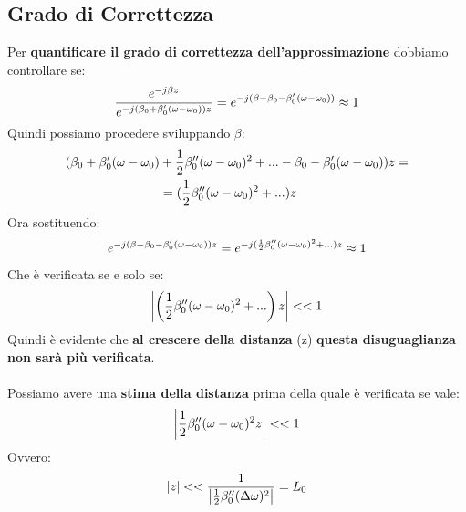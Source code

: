 \subsection{Grado di Correttezza}
Per \textbf{quantificare il grado di correttezza dell'approssimazione} dobbiamo controllare se:
\begin{equation*}
    \frac{e^{-j\beta z}}{e^{-j(\beta_0 + \beta'_0 (\omega - \omega_0))z}} = e^{-j (\beta - \beta_0 - \beta'_0 (\omega - \omega_0))} \approx 1
\end{equation*}
Quindi possiamo procedere sviluppando $\beta$:
\begin{equation*}
\begin{aligned}
        (\beta_0 + \beta'_0 (\omega - \omega_0) &+ \frac{1}{2}\beta''_0 (\omega - \omega_0)^2 + ... - \beta_0 - \beta'_0 (\omega - \omega_0) )z = \\
        &=(\frac{1}{2} \beta''_0 (\omega - \omega_0)^2 + ...)z
\end{aligned}
\end{equation*}
Ora sostituendo:
\begin{equation*}
    e^{-j(\beta - \beta_0 - \beta'_0 (\omega - \omega_0))z} = e^{-j(\frac{1}{2} \beta''_0(\omega - \omega_0)^2 + ...)z} \approx 1
\end{equation*}
Che è verificata se e solo se:
\begin{equation*}
    \left|\left(\frac{1}{2} \beta''_0(\omega - \omega_0)^2 + ...\right)z\right| <<1
\end{equation*}
Quindi è evidente che \textbf{al crescere della distanza} (z) \textbf{questa disuguaglianza non sarà più verificata}.\\ \\

Possiamo avere una \textbf{stima della distanza} prima della quale è verificata se vale:
\begin{equation*}
    \left|\frac{1}{2} \beta''_0(\omega - \omega_0)^2 z \right| << 1
\end{equation*}
Ovvero: 
\begin{equation*}
    |z| << \frac{1}{ \left|\frac{1}{2} \beta''_0(\Delta \omega)^2 \right|} = L_0
\end{equation*}















































